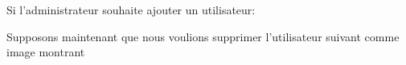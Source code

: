 \documentclass{article}
\begin{document}
\begin{enumerate}
  
  
  \vspace{0.7cm}
               \hspace*{-0.7in}
               \noindent{}
  
  
  Si l'administrateur souhaite ajouter un utilisateur:
  
  
   
  \vspace{0.7cm}
               \hspace*{-0.7in}
               \noindent{}
  
  
  
  Supposons maintenant que nous voulions supprimer l'utilisateur suivant comme image montrant
  

\end{enumerate}
\end{document}
